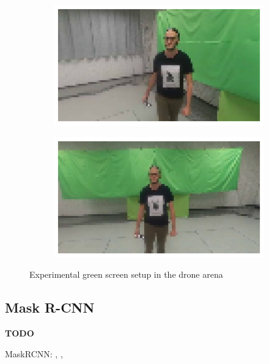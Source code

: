 \begin{figure}[!h]
\begin{center}
\begin{subfigure}[h]{0.24\textwidth}
		\end{subfigure}
		\hfill
		\begin{subfigure}[h]{0.24\textwidth}
			\centering
			\includegraphics[width=1\textwidth]{"contents/images/04-greenscreen-3"}
		\end{subfigure}
		\hfill
		\begin{subfigure}[h]{0.24\textwidth}
			\centering
			\includegraphics[width=1\textwidth]{"contents/images/04-greenscreen-4"}
		\end{subfigure}
	\end{center}
	\vspace{-0.5cm}
	\caption[Experimental green screen setup in the drone arena]{Experimental green screen setup in the drone arena}
	\label{fig:greenscreen}
\end{figure}



\subsection{Mask R-CNN}
\label{subsec:sota-maskrcnn}

\textbf{TODO}

MaskRCNN: \cite{he2018mask}, \cite{maskrcnn_explanation}, \cite{maskrcnn_arcgis}





